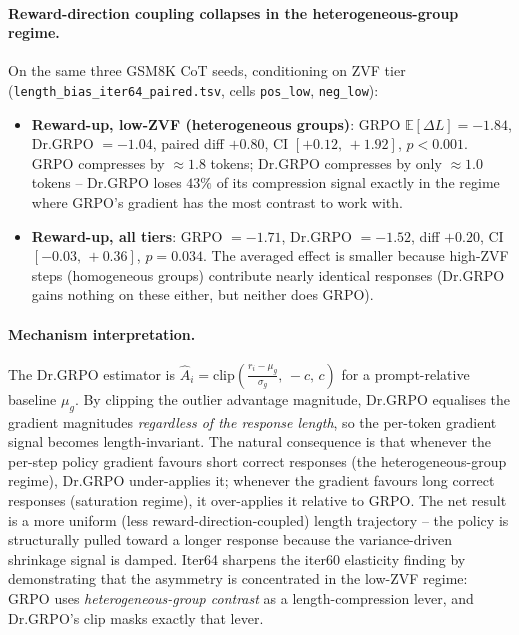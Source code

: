 \documentclass{article}
\begin{document}
\paragraph{Reward-direction coupling collapses in the heterogeneous-group regime.}
On the same three GSM8K CoT seeds, conditioning on ZVF tier
(\texttt{length\_bias\_iter64\_paired.tsv}, cells \texttt{pos\_low},
\texttt{neg\_low}):
\begin{itemize}
\item \textbf{Reward-up, low-ZVF (heterogeneous groups)}:
      GRPO $\mathbb{E}[\Delta L] = -1.84$, Dr.GRPO $= -1.04$,
      paired diff $+0.80$, CI $[+0.12,\, +1.92]$, $p < 0.001$.
      GRPO compresses by $\approx 1.8$ tokens; Dr.GRPO compresses by
      only $\approx 1.0$ tokens -- Dr.GRPO loses $43\%$ of its
      compression signal exactly in the regime where GRPO's gradient
      has the most contrast to work with.
\item \textbf{Reward-up, all tiers}:
      GRPO $= -1.71$, Dr.GRPO $= -1.52$, diff $+0.20$,
      CI $[-0.03,\, +0.36]$, $p = 0.034$. The averaged effect is
      smaller because high-ZVF steps (homogeneous groups) contribute
      nearly identical responses (Dr.GRPO gains nothing on these
      either, but neither does GRPO).
\end{itemize}

\paragraph{Mechanism interpretation.}
The Dr.GRPO estimator is $\hat A_i = \mathrm{clip}\!\left(\frac{r_i - \mu_g}{\sigma_g},\, -c,\, c\right)$
for a prompt-relative baseline $\mu_g$. By clipping the outlier
advantage magnitude, Dr.GRPO equalises the gradient magnitudes
\emph{regardless of the response length}, so the per-token gradient
signal becomes length-invariant. The natural consequence is that
whenever the per-step policy gradient favours short correct responses
(the heterogeneous-group regime), Dr.GRPO under-applies it; whenever
the gradient favours long correct responses (saturation regime), it
over-applies it relative to GRPO. The net result is a more uniform
(less reward-direction-coupled) length trajectory -- the policy is
structurally pulled toward a longer response because the variance-driven
shrinkage signal is damped. Iter64 sharpens the iter60 elasticity
finding by demonstrating that the asymmetry is concentrated in the
low-ZVF regime: GRPO uses \emph{heterogeneous-group contrast} as a
length-compression lever, and Dr.GRPO's clip masks exactly that lever.
\end{document}
